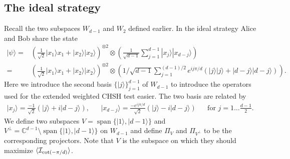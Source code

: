 \documentclass[11pt,letterpaper]{article}
\newcommand{\ket}[1]{|#1\rangle}
\newcommand{\x}{\otimes}
\DeclarePairedDelimiter{\ip}{\langle}{\rangle}
\DeclareMathOperator{\spn}{span}
\newcommand{\C}{\mathbb{C}}
\newcommand{\1}{\mathbb{1}}
\newcommand{\I}{\mathcal{I}}
\theoremstyle{definition}
\begin{document}
\subsection{The ideal strategy}
Recall the two subspaces $W_{d-1}$ and $W_2$ defined earlier. 
In the ideal strategy Alice and Bob share the state 
\begin{align}
\ket{\psi} = &(\frac{1}{\sqrt{2}} \ket{x_1}{x_1} + \ket{x_2}\ket{x_2})^{\x 2} \x \left(\frac{1}{\sqrt{d-1}} \sum_{j=1}^{d-1} \ket{x_j}\ket{x_{d-j}}\right)\\
=&(\frac{1}{\sqrt{2}} \ket{x_1}{x_1} + \ket{x_2}\ket{x_2})^{\x 2} \x \left(1/\sqrt{d-1} \sum_{j=1}^{(d-1)/2} e^{ij\pi/d}(\ket{j}\ket{j} + \ket{d-j}\ket{d-j})\right).
\end{align}
Here we introduce the second basis $\{ \ket{j} \}_{j=1}^{d-1}$ of $W_{d-1}$ to introduce the 
operators used for the extended weighted CHSH test easier. The two basis are related by
\begin{align}
	\ket{x_j} = \frac{-1}{\sqrt{2}}(\ket{j} + i\ket{d-j}), &&
	\ket{x_{d-j}} = \frac{-e^{ij\pi/d}}{\sqrt{2}}(\ket{j} - i\ket{d-j}) && \text{for } j = 1 \dots \frac{d-1}{2}.
\end{align}
We define two subspaces $V = \spn\{\ket{1}, \ket{d-1}\}$ and $V^\perp = \C^{d-1} \setminus\spn\{\ket{1}, \ket{d-1}\}$ on
$W_{d-1}$ and
define $\Pi_V$ and $\Pi_{V^\perp}$ to be the corresponding projectors. Note that $V$ is the subspace on which they should maximize $\ip{\I_{\cot(-\pi/d)}}$.
\end{document}
